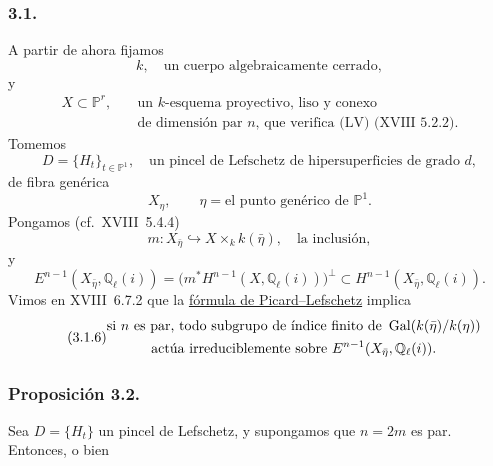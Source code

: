 \subsubsection*{3.1.}
A partir de ahora fijamos
\begin{equation}\tag{3.1.0}
k,\quad\text{un cuerpo algebraicamente cerrado},
\end{equation}
y
\begin{equation}\tag{3.1.1}
\begin{aligned}
X\subset\mathbb P^r,\quad
&\text{un $k$-esquema proyectivo, liso y conexo}\\
&\text{de dimensión par $n$, que verifica (LV) (XVIII~5.2.2).}
\end{aligned}
\end{equation}
Tomemos
\begin{equation}\tag{3.1.2}
D=\{H_t\}_{t\in\mathbb P^1},
\quad\text{un pincel de Lefschetz de hipersuperficies de grado $d$},
\end{equation}
de fibra genérica
\begin{equation}\tag{3.1.3}
X_\eta,\qquad \eta=\text{el punto genérico de }\mathbb P^1.
\end{equation}
Pongamos (cf.~XVIII~5.4.4)
\begin{equation}\tag{3.1.4}
m:X_{\bar\eta}\hookrightarrow X\times_k k(\bar\eta),
\quad\text{la inclusión},
\end{equation}
y
\begin{equation}\tag{3.1.5}
E^{n-1}(X_{\bar\eta},\mathbb Q_\ell(i))
=\bigl(m^*H^{n-1}(X,\mathbb Q_\ell(i))\bigr)^\perp
\subset H^{n-1}(X_{\bar\eta},\mathbb Q_\ell(i)).
\end{equation}
Vimos en XVIII~6.7.2 que la \underline{fórmula de Picard--Lefschetz}
implica
\begin{equation}\tag{3.1.6}
\begin{gathered}
\text{si $n$ es par, todo subgrupo de índice finito de }
\operatorname{Gal}(k(\bar\eta)/k(\eta))\\
\text{actúa irreduciblemente sobre }
E^{\sisi{2n-1}{n-1}}(X_{\bar\eta},\mathbb Q_\ell(i)).
\end{gathered}
\end{equation}

\subsubsection*{Proposición 3.2.}
Sea $D=\{H_t\}$ un pincel de Lefschetz, y supongamos que $n=2m$ es par.
Entonces, o bien


